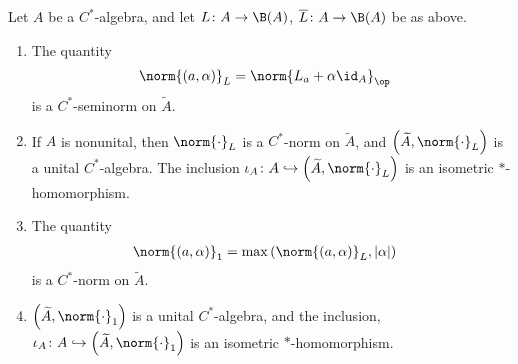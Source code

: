 \documentclass[10pt]{mypackage}
\begin{document}
\begin{proposition}
  Let $A$ be a $C^{\ast}$-algebra, and let $L\colon A\rightarrow \B(A)$, $\overline{L}\colon A\rightarrow \B(A)$ be as above. 
  \begin{enumerate}[(1)]
    \item The quantity
      \begin{align*}
        \norm{\left(a,\alpha\right)}_{L} &= \norm{L_a + \alpha \id_{A}}_{\op}
      \end{align*}
      is a $C^{\ast}$-seminorm on $\widetilde{A}$.
    \item If $A$ is nonunital, then $\norm{\cdot}_L$ is a $C^{\ast}$-norm on $\widetilde{A}$, and $\left(\widetilde{A},\norm{\cdot}_L\right)$ is a unital $C^{\ast}$-algebra. The inclusion $\iota_A\colon A\hookrightarrow \left(\widetilde{A},\norm{\cdot}_L\right)$ is an isometric $\ast$-homomorphism.
    \item The quantity
      \begin{align*}
        \norm{\left(a,\alpha\right)}_{1} &= \max\left(\norm{\left(a,\alpha\right)}_L,\left\vert \alpha \right\vert\right)
      \end{align*}
      is a $C^{\ast}$-norm on $\widetilde{A}$.
    \item $\left(\widetilde{A},\norm{\cdot}_1\right)$ is a unital $C^{\ast}$-algebra, and the inclusion, $\iota_A\colon A\hookrightarrow \left(\widetilde{A},\norm{\cdot}_1\right)$ is an isometric $\ast$-homomorphism.
  \end{enumerate}
\end{proposition}
\end{document}
